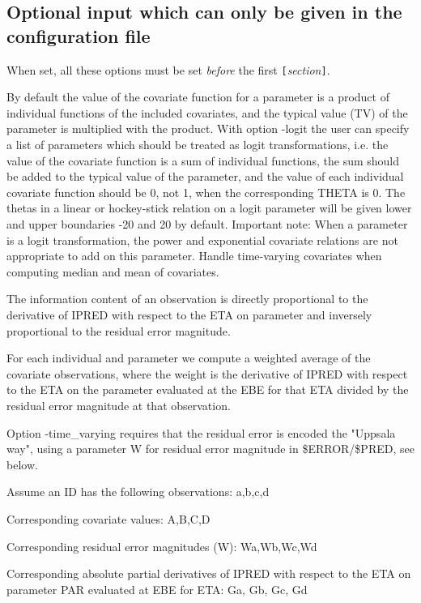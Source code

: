 \subsection{Optional input which can only be given in the configuration file}
When set, all these options must be set \emph{before} the first 
\verb|[|\emph{section}\verb|]|.

\begin{optionlist}
By default the value of the covariate function for a parameter is a  product of individual functions of the included covariates, and the typical value (TV) of the parameter is multiplied with the product. With option -logit the user can specify a list of parameters which should be treated as logit transformations, i.e. the value of the covariate function is a sum of individual functions, the sum should be added to the typical value of the parameter, and the value of each individual covariate function should be 0, not 1, when the corresponding THETA is 0. The thetas in a linear or hockey-stick relation on a logit parameter will be given lower and upper boundaries -20 and 20 by default. Important note: When a parameter is a logit transformation, the power and exponential covariate relations are not appropriate to add on this parameter. 
\nextopt
{}
Handle time-varying covariates when computing median and mean of covariates.

The information content of an observation
is directly proportional to the derivative of IPRED with
respect to the ETA on parameter
and inversely proportional to the residual error magnitude.

For each individual and parameter
we compute a weighted average of the covariate
observations, where the weight is
the derivative of IPRED with
respect to the ETA on the parameter evaluated at the EBE for that ETA
divided by the residual error magnitude at that observation.

Option -time\_varying requires that the residual error is
encoded the "Uppsala way", using a parameter W for residual error magnitude
in \$ERROR/\$PRED, see below.

Assume an ID has the following observations: a,b,c,d

Corresponding covariate values: A,B,C,D

Corresponding residual error magnitudes (W): Wa,Wb,Wc,Wd

Corresponding absolute partial derivatives of IPRED with respect
to the ETA on parameter PAR evaluated at EBE for ETA: Ga, Gb, Gc, Gd


\end{optionlist}
